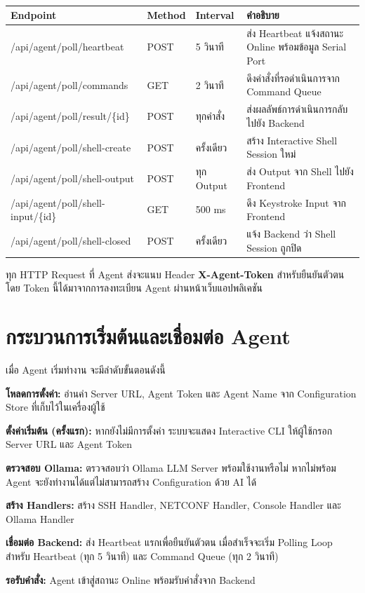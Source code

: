 \begin{table}[H]
\centering
\caption{}
\label{tabD2:PollingEndpoints}
\fontSixTeen
\begin{tabularx}{\textwidth}{|l|l|l|X|}
\hline
\textbf{Endpoint} & \textbf{Method} & \textbf{Interval} & \textbf{คำอธิบาย} \\
\hline
/api/agent/poll/heartbeat & POST & 5 วินาที & ส่ง Heartbeat แจ้งสถานะ Online พร้อมข้อมูล Serial Port \\
\hline
/api/agent/poll/commands & GET & 2 วินาที & ดึงคำสั่งที่รอดำเนินการจาก Command Queue \\
\hline
/api/agent/poll/result/\{id\} & POST & ทุกคำสั่ง & ส่งผลลัพธ์การดำเนินการกลับไปยัง Backend \\
\hline
/api/agent/poll/shell-create & POST & ครั้งเดียว & สร้าง Interactive Shell Session ใหม่ \\
\hline
/api/agent/poll/shell-output & POST & ทุก Output & ส่ง Output จาก Shell ไปยัง Frontend \\
\hline
/api/agent/poll/shell-input/\{id\} & GET & 500 ms & ดึง Keystroke Input จาก Frontend \\
\hline
/api/agent/poll/shell-closed & POST & ครั้งเดียว & แจ้ง Backend ว่า Shell Session ถูกปิด \\
\hline
\end{tabularx}
\end{table}

\hspace*{1.3em}
ทุก HTTP Request ที่ Agent ส่งจะแนบ Header \textbf{X-Agent-Token} สำหรับยืนยันตัวตน โดย Token นี้ได้มาจากการลงทะเบียน Agent ผ่านหน้าเว็บแอปพลิเคชัน

\section{กระบวนการเริ่มต้นและเชื่อมต่อ Agent}
\hspace*{1.3em}
เมื่อ Agent เริ่มทำงาน จะมีลำดับขั้นตอนดังนี้

\begin{mycustomenum2}
    \item \textbf{โหลดการตั้งค่า:} อ่านค่า Server URL, Agent Token และ Agent Name จาก Configuration Store ที่เก็บไว้ในเครื่องผู้ใช้
    \item \textbf{ตั้งค่าเริ่มต้น (ครั้งแรก):} หากยังไม่มีการตั้งค่า ระบบจะแสดง Interactive CLI ให้ผู้ใช้กรอก Server URL และ Agent Token
    \item \textbf{ตรวจสอบ Ollama:} ตรวจสอบว่า Ollama LLM Server พร้อมใช้งานหรือไม่ หากไม่พร้อม Agent จะยังทำงานได้แต่ไม่สามารถสร้าง Configuration ด้วย AI ได้
    \item \textbf{สร้าง Handlers:} สร้าง SSH Handler, NETCONF Handler, Console Handler และ Ollama Handler
    \item \textbf{เชื่อมต่อ Backend:} ส่ง Heartbeat แรกเพื่อยืนยันตัวตน เมื่อสำเร็จจะเริ่ม Polling Loop สำหรับ Heartbeat (ทุก 5 วินาที) และ Command Queue (ทุก 2 วินาที)
    \item \textbf{รอรับคำสั่ง:} Agent เข้าสู่สถานะ Online พร้อมรับคำสั่งจาก Backend
\end{mycustomenum2}

